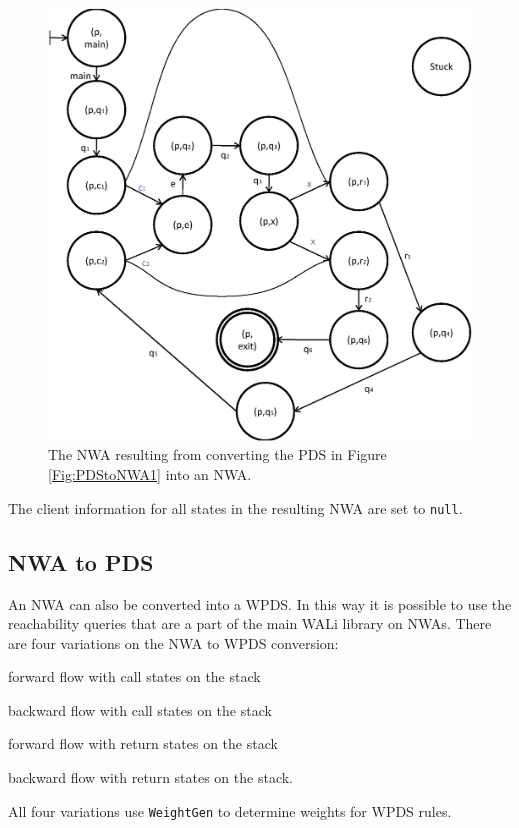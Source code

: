 \documentclass{llncs}
\begin{document}
\begin{figure}[p]
  \centering
    \includegraphics[width=12cm]{Figures/Figure22.eps}
  \caption{The NWA resulting from converting the PDS in Figure \ref{Fig:PDStoNWA1} into an NWA.}
  \label{Fig:PDStoNWA2}
\end{figure}

The client information for all states in the resulting NWA are set to \texttt{null}.

\subsection{NWA to PDS}
\label{Se:NWAtoPDS}

An NWA can also be converted into a WPDS.  In this way it is possible to use the reachability queries that are a part of the main WALi library on NWAs.  There are four variations on the NWA to WPDS conversion: \begin{inparaenum} \item forward flow with call states on the stack \item backward flow with call states on the stack \item forward flow with return states on the stack \item backward flow with return states on the stack. \end{inparaenum}  All four variations use \texttt{WeightGen} to determine weights for WPDS rules.
\end{document}
